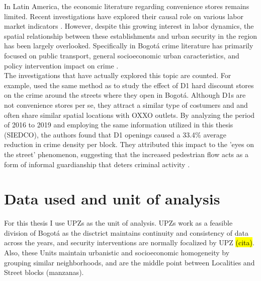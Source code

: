 \documentclass[12pt]{article}
\begin{document}
In Latin America, the economic literature regarding convenience stores remains limited. Recent investigations have explored their causal role on various labor market indicators \parencite{delgado2024, marcos2022}. 
However, despite this growing interest in labor dynamics, the spatial relationship between these establishments and urban security in the region has been largely overlooked. Specifically in Bogotá crime literature has primarily focused on public transport, general socioeconomic urban caracteristics, and policy intervention impact on crime \parencite{moreno2005impacto, bacares2013impact}.\\ 

The investigations that have actually explored this topic are counted. 
For example,  \cite{jaramillo2021low} used the same method as \parencite{shin2024dollar} to study the effect of D1 hard discount stores on the crime around the streets where they open in Bogotá. 
Although D1s are not convenience stores per se, they attract a similar type of costumers and and often share similar spatial locations with OXXO outlets. By analyzing the period of 2016 to 2019 and employing the same information utilized in this thesis (SIEDCO), the authors found that D1 openings caused a 33.4\% average reduction in crime density per block. 
They attributed this impact to the 'eyes on the street' phenomenon, suggesting that the increased pedestrian flow acts as a form of informal guardianship that deters criminal activity \parencite{ jacobs1961death, jaramillo2021low}.\\ 

\section{Data used and unit of analysis}

For this thesis I use UPZs as the unit of analysis. UPZs work as a feasible division of Bogotá as the disctrict maintains continuity and consistency of data across the years, and security interventions are normally focalized by UPZ \hl{(cita)}. 
Also, these Units maintain urbanistic and socioeconomic homogeneity by grouping similar neighborhoods, and are the middle point between Localities and Street blocks (manzanas).\\ 
\end{document}
